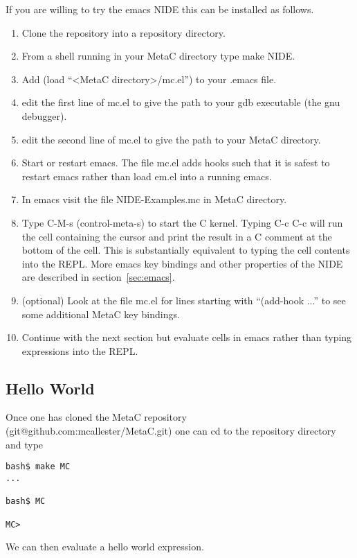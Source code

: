 \documentclass{article}
\begin{document}
If you are willing to try the emacs NIDE this can be installed as follows.

\begin{enumerate}
\item Clone the repository into a repository directory.
\item From a shell running in your MetaC directory type make NIDE.
\item Add (load ``<MetaC directory>/mc.el'') to your .emacs file.
\item edit the first line of  mc.el to give the path to your gdb executable (the gnu debugger).
\item edit the second line of mc.el to give the path to your MetaC directory.
\item Start or restart emacs. The file mc.el adds hooks such that it is safest to restart emacs rather than load em.el into a running emacs.
\item In emacs visit the file NIDE-Examples.mc in MetaC directory.
\item Type C-M-s (control-meta-s) to start the C kernel. Typing C-c C-c will run the cell containing the cursor and print
  the result in a C comment at the bottom of the cell.  This is substantially equivalent to typing the cell contents into the REPL.
  More emacs key bindings and other properties of the NIDE are described in section~\ref{sec:emacs}.
  \item (optional) Look at the file mc.el for lines starting with ``(add-hook ...''  to see some additional MetaC key bindings.
\item Continue with the next section but evaluate cells in emacs rather than typing expressions into the REPL.
\end{enumerate}

\subsection{Hello World}
\label{sec:hello}

Once one has cloned the MetaC repository (git@github.com:mcallester/MetaC.git) one can cd to the repository directory and type 

\begin{verbatim}
bash$ make MC
...

bash$ MC

MC>
\end{verbatim}

We can then evaluate a hello world expression.
\end{document}
